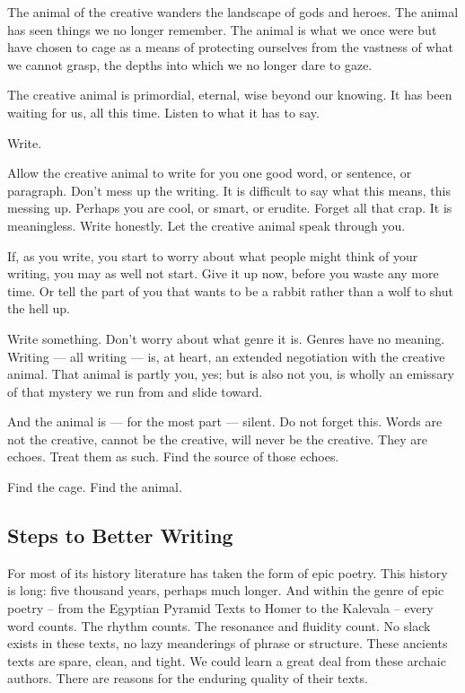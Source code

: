 \documentclass[letterpaper,10pt,headsepline]{scrreprt}
\begin{document}
The animal of the creative wanders the landscape of gods and heroes. The animal has seen things we no longer remember. The animal is what we once were but have chosen to cage as a means of protecting ourselves from the vastness of what we cannot grasp, the depths into which we no longer dare to gaze.

The creative animal is primordial, eternal, wise beyond our knowing. It has been waiting for us, all this time. Listen to what it has to say.

Write.

Allow the creative animal to write for you one good word, or sentence, or paragraph. Don't mess up the writing. It is difficult to say what this means, this messing up. Perhaps you are cool, or smart, or erudite. Forget all that crap. It is meaningless. Write honestly. Let the creative animal speak through you.

If, as you write, you start to worry about what people might think of your writing, you may as well not start. Give it up now, before you waste any more time. Or tell the part of you that wants to be a rabbit rather than a wolf to shut the hell up.

Write something. Don't worry about what genre it is. Genres have no meaning. Writing — all writing — is, at heart, an extended negotiation with the creative animal. That animal is partly you, yes; but is also not you, is wholly an emissary of that mystery we run from and slide toward.

And the animal is — for the most part — silent. Do not forget this. Words are not the creative, cannot be the creative, will never be the creative. They are echoes. Treat them as such. Find the source of those echoes.

Find the cage. Find the animal.

\subsection{Steps to Better Writing}

For most of its history literature has taken the form of epic poetry. This history is long: five thousand years, perhaps much longer. And within the genre of epic poetry -- from the Egyptian Pyramid Texts to Homer to the Kalevala -- every word counts. The rhythm counts. The resonance and fluidity count. No slack exists in these texts, no lazy meanderings of phrase or structure. These ancients texts are spare, clean, and tight. We could learn a great deal from these archaic authors. There are reasons for the enduring quality of their texts.
\end{document}
